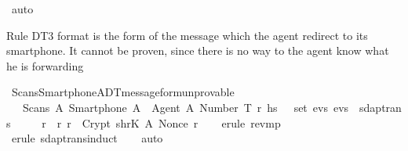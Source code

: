 \begin{isabellebody}
  \ {\isacharparenleft}auto{\isacharparenright}\isanewline
  \isamarkupfalse%
  \endisatagproof
  {\isafoldproof}%
  \isadelimproof
  \endisadelimproof
  \begin{isamarkuptext}%
  Rule DT3 format is the form of the message which the agent redirect to its smartphone.
  It cannot be proven, since there is no way to the agent know what he is forwarding%
  \end{isamarkuptext}\isamarkuptrue%
  \isamarkupfalse%
  \ Scans{\isacharunderscore}Smartphone{\isacharunderscore}A{\isacharunderscore}DT{}{\isacharunderscore}message{\isacharunderscore}form{\isacharunderscore}unprovable\ {\isacharcolon}\ \isanewline
  \ \ {\isachardoublequoteopen}{\isasymlbrakk}\ Scans\ A\ {\isacharparenleft}Smartphone\ A{\isacharparenright}\ {\isasymlbrace}\ {\isasymlbrace}Agent\ A{\isacharcomma}\ Number\ T{\isasymrbrace}{\isacharcomma}\ r{\isacharprime}{\isacharcomma}\ h\isactrlsub s\ {\isasymrbrace}\ {\isasymin}\ set\ evs{\isacharsemicolon}\ evs\ {\isasymin}\ sdaptrans\ {\isasymrbrakk}\isanewline
  \ \ {\isasymLongrightarrow}\ {\isacharparenleft}{\isasymexists}\ r{\isacharprime}{\isachardot}\ {\isacharparenleft}{\isasymexists}\ r{\isachardot}\ r{\isacharprime}\ {\isasymnoteq}\ Crypt\ {\isacharparenleft}shrK\ A{\isacharparenright}\ {\isacharparenleft}Nonce\ r{\isacharparenright}{\isacharparenright}{\isacharparenright}{\isachardoublequoteclose}\isanewline
  \isadelimproof
  \ \ %
  \endisadelimproof
  \isatagproof
  \isamarkupfalse%
  \ {\isacharparenleft}erule\ rev{\isacharunderscore}mp{\isacharparenright}\isanewline
  \ \ \isamarkupfalse%
  \ {\isacharparenleft}erule\ sdaptrans{\isachardot}induct{\isacharparenright}\isanewline
  \ \ \isamarkupfalse%
  \ {\isacharparenleft}auto{\isacharparenright}\isanewline
  \isamarkupfalse%
  \endisatagproof
  {\isafoldproof}%
  \isadelimproof
  \isanewline
  \endisadelimproof
  \isadelimtheory
  \isanewline
  \endisadelimtheory
  \isatagtheory
  \isamarkupfalse%
  \endisatagtheory
  {\isafoldtheory}%
  \isadelimtheory
  \endisadelimtheory
  \end{isabellebody}%
  \endinput

